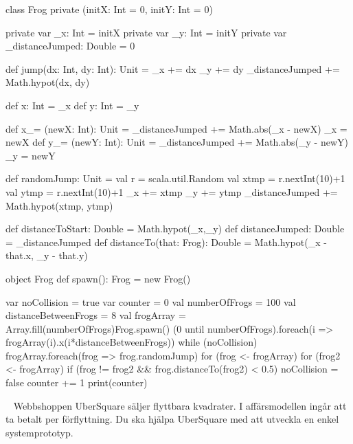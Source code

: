 \SubtaskSolved  \begin{CodeSmall}
class Frog private (initX: Int = 0, initY: Int = 0) {
	private var _x: Int = initX
	private var _y: Int = initY
	private var _distanceJumped: Double = 0

	def jump(dx: Int, dy: Int): Unit = {
		_x += dx
		_y += dy
		_distanceJumped += Math.hypot(dx, dy)
	}

	def x: Int = _x
	def y: Int = _y

	def x_= (newX: Int): Unit = {
		_distanceJumped += Math.abs(_x - newX)
		_x = newX
	}
	def y_= (newY: Int): Unit = {
		_distanceJumped += Math.abs(_y - newY)
		_y = newY
	}

	def randomJump: Unit = {
		val r = scala.util.Random
		val xtmp = r.nextInt(10)+1
		val ytmp = r.nextInt(10)+1
		_x += xtmp
		_y += ytmp
		_distanceJumped += Math.hypot(xtmp, ytmp)
	}

	def distanceToStart: Double = Math.hypot(_x,_y)
	def distanceJumped: Double = _distanceJumped
	def distanceTo(that: Frog): Double = Math.hypot(_x - that.x, _y - that.y)
}

object Frog {
	def spawn(): Frog = new Frog()
}
\end{CodeSmall}

\SubtaskSolved  \begin{CodeSmall}
var noCollision = true
var counter = 0
val numberOfFrogs = 100
val distanceBetweenFrogs = 8
val frogArray = Array.fill(numberOfFrogs){Frog.spawn()}
(0 until numberOfFrogs).foreach(i => frogArray(i).x(i*distanceBetweenFrogs))
while (noCollision) {
	frogArray.foreach(frog => frog.randomJump)
	for (frog <- frogArray) {
		for (frog2 <- frogArray) {
			if (frog != frog2 && frog.distanceTo(frog2) < 0.5) {
				noCollision = false
			}
		}
	}
	counter += 1
}
print(counter)
\end{CodeSmall}


\clearpage

\ExtraTasks %


\QUESTEND









\QUESTBEGIN

\Task  \what~  Webbshoppen UberSquare säljer flyttbara kvadrater. I affärsmodellen ingår att ta betalt per förflyttning. Du ska hjälpa UberSquare med att utveckla en enkel systemprototyp.

